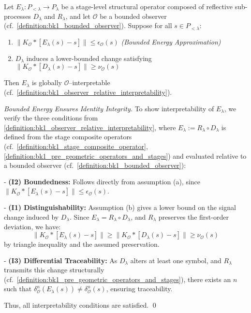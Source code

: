 \begin{proposition}
\label{prop:bk1_stage_composite_operators_are_interpretable}

Let \(E_\lambda : P_{<\lambda} \to P_\lambda\) be a stage-level structural operator  
composed of reflective sub-processes \(D_\lambda\) and \(R_\lambda\),  
and let \(\mathcal{O}\) be a bounded observer (cf.~\ref{definition:bk1_bounded_observer}).  
Suppose for all \(s \in P_{<\lambda}\):

\begin{enumerate}[label=(\alph*)]
    \item \(\|K_{\mathcal{O}} \ast [E_\lambda(s) - s]\| \le \epsilon_{\mathcal{O}}(s)\) \hfill \textit{(Bounded Energy Approximation)}
    \item \(D_\lambda\) induces a lower-bounded change satisfying \(\|K_{\mathcal{O}} \ast [D_\lambda(s) - s]\| \ge \nu_{\mathcal{O}}(s)\)
\end{enumerate}

Then \(E_\lambda\) is globally \(\mathcal{O}\)–interpretable (cf.~\ref{definition:bk1_observer_relative_interpretability}).

\end{proposition}

\begin{proof}[Bounded Energy Ensures Identity Integrity]
\label{proof:bk1_energy_bound_identity}
To show interpretability of \(E_\lambda\), we verify the three conditions from \ref{definition:bk1_observer_relative_interpretability}, where \(E_\lambda := R_\lambda \circ D_\lambda\) is defined from the stage composite operators (cf.~\ref{definition:bk1_stage_composite_operator}, \ref{definition:bk1_pre_geometric_operators_and_stages}) and evaluated relative to a bounded observer (cf.~\ref{definition:bk1_bounded_observer}):

- \textbf{(I2) Boundedness:}  
  Follows directly from assumption (a), since \(\|K_{\mathcal{O}} \ast [E_\lambda(s) - s]\| \le \epsilon_{\mathcal{O}}(s)\).

- \textbf{(I1) Distinguishability:}  
  Assumption (b) gives a lower bound on the signal change induced by \(D_\lambda\).  
  Since \(E_\lambda = R_\lambda \circ D_\lambda\), and \(R_\lambda\) preserves the first-order deviation,  
  we have:  
  \[
  \|K_{\mathcal{O}} \ast [E_\lambda(s) - s]\| \ge \|K_{\mathcal{O}} \ast [D_\lambda(s) - s]\| \ge \nu_{\mathcal{O}}(s)
  \]
  by triangle inequality and the assumed preservation.

- \textbf{(I3) Differential Traceability:}  
  As \(D_\lambda\) alters at least one symbol, and \(R_\lambda\) transmits this change structurally  
  (cf.~\ref{definition:bk1_pre_geometric_operators_and_stages}),  
  there exists an \(n\) such that \(\delta^n_{\mathcal{O}}(E_\lambda(s)) \ne \delta^n_{\mathcal{O}}(s)\),  
  ensuring traceability.

Thus, all interpretability conditions are satisfied. \qed
\end{proof}

